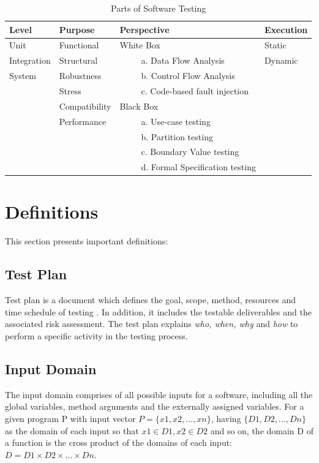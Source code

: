\begin{table}[ht]
\caption{Parts of Software Testing} %
\bigskip
\centering %
{\renewcommand{\arraystretch}{1.5} %
\begin{tabular}{| l | l | l | l | } %
\hline

Level 					&Purpose		 		& Perspective							& Execution 	\\
\hline
Unit						& Functional			& White Box							& Static 		\\
Integration				& Structural			& ~~~~~a. Data Flow Analysis				& Dynamic	\\
System					& Robustness			& ~~~~~b. Control Flow Analysis			&			\\
						& Stress				& ~~~~~c. Code-based fault injection &			\\
						& Compatibility			& Black Box							&			\\
						& Performance			& ~~~~~a. Use-case testing				&			\\
						&					& ~~~~~b. Partition testing				&			\\
						&					& ~~~~~c. Boundary Value testing			&			\\
						&					& ~~~~~d. Formal Specification testing		&			\\



\hline %
\end{tabular}
}
\bigskip
\label{table:softwareTestingParts} %
\end{table}

\section{Definitions}
This section presents important definitions:

\subsection{Test Plan}
Test plan is a document which defines the goal, scope, method, resources and time schedule of testing \cite{futrell2001quality}. In addition, it includes the testable deliverables and the associated risk assessment. The test plan explains {\it {who, when, why}} and {\it {how}} to perform a specific activity in the testing process. 

\subsection{Input Domain} 
The input domain comprises of all possible inputs for a software, including all the global variables, method arguments and the externally assigned variables. For a given program P with input vector $ P =\{x1, x2, . . . , xn\}$, having $\{D1, D2, . . . , Dn\}$ as the domain of each input so that $x1 \in D1, x2 \in D2$ and so on, the domain D of a function is the cross product of the domains of each input: $D = D1 \times D2 \times . . . \times Dn$.

